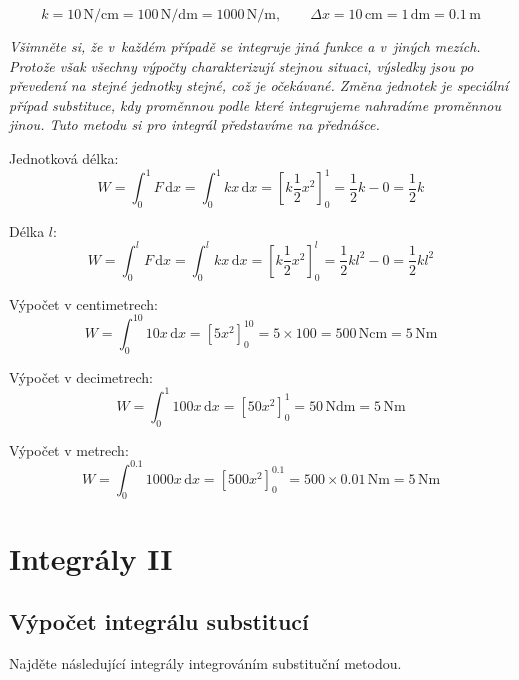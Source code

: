 $$k=10 \,\mathrm{N}/\mathrm{cm}=100 \,\mathrm{N}/\mathrm{dm}=1000 \,\mathrm{N}/\mathrm{m}, \qquad \Delta x=10\,\mathrm{cm}=1\,\mathrm{dm}=0.1\,\mathrm{m}$$

\textit{Všimněte si, že v každém případě se integruje jiná funkce a v jiných
mezích. Protože však všechny výpočty charakterizují stejnou situaci,
výsledky jsou po převedení na stejné jednotky stejné, což je
očekávané. 
Změna jednotek je speciální případ substituce, kdy proměnnou podle
které integrujeme nahradíme proměnnou jinou. Tuto metodu si pro
integrál představíme na přednášce.
}

\reseni

Jednotková délka:
$$W=\int_0^1 F\,\mathrm dx = \int_0^1 kx\,\mathrm dx = \left[k\frac 12 x^2\right]_0^1=\frac 12 k-0=\frac 12 k$$

Délka $l$:
$$W=\int_0^l F\,\mathrm dx = \int_0^l kx\,\mathrm dx = \left[k\frac 12 x^2\right]_0^l=\frac 12 kl^2-0=\frac 12 kl^2$$

Výpočet v centimetrech:
$$W=\int_0^{10}  10 x\,\mathrm dx = \left[5 x^2\right]_0^{10}=5\times 100=500\,\mathrm N \mathrm{cm}=5\,\mathrm N\mathrm m$$


Výpočet v decimetrech:
$$W=\int_0^{1}  100 x\,\mathrm dx = \left[50 x^2\right]_0^{1}=50\,\mathrm N \mathrm{dm}=5\,\mathrm N\mathrm m$$

Výpočet v metrech:
$$W=\int_0^{0.1}  1000 x\,\mathrm dx = \left[500 x^2\right]_0^{0.1}=500\times 0.01\,\mathrm N \mathrm{m}=5\,\mathrm N \mathrm{m}$$


\konec





\stranka
\section{Integrály II}



\stranka
\subsection{Výpočet integrálu substitucí} Najděte následující integrály integrováním substituční metodou.

